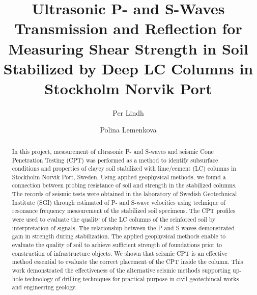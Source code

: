 \documentclass[final,3p,times,twocolumn]{elsarticle}
\begin{document}
\begin{frontmatter}

\title{Ultrasonic P- and S-Waves Transmission and Reflection for Measuring Shear Strength in Soil Stabilized by Deep LC Columns in Stockholm Norvik Port}

\author[label1,label2]{Per Lindh}


\author[label3]{Polina Lemenkova}

\begin{abstract} In this project, measurement of ultrasonic P- and S-waves and seismic Cone Penetration Testing (CPT) was performed as a method to identify subsurface conditions and properties of clayey soil stabilized with lime/cement (LC) columns in Stockholm Norvik Port, Sweden. Using applied geophysical methods, we found a connection between probing resistance of soil and strength in the stabilized columns. The records of  seismic tests were obtained in the laboratory of Swedish Geotechnical Institute (SGI) through estimated of P- and S-wave velocities using technique of resonance frequency measurement of the stabilized soil specimens. The CPT profiles were used to evaluate the quality of the LC columns of the reinforced soil by interpretation of signals. The relationship between the P and S waves demonstrated gain in strength during stabilization. The applied geophysical methods enable to evaluate the quality of soil to achieve sufficient strength of foundations prior to construction of infrastructure objects. We shown that seismic CPT is an effective method essential to evaluate the correct placement of the CPT inside the column. This work demonstrated the effectiveness of the alternative seismic methods supporting up-hole technology of drilling techniques for practical purpose in civil geotechincal works and engineering geology. \end{abstract}


\end{frontmatter}
\end{document}

